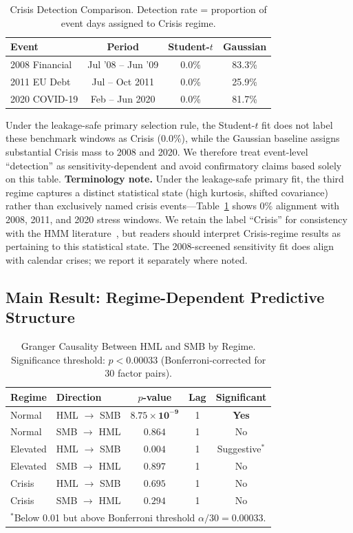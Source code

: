 \documentclass[sigconf,anonymous]{acmart}
\begin{document}
\begin{table}[t]
\centering
\caption{Crisis Detection Comparison. Detection rate = proportion of event days
assigned to Crisis regime.}
\label{tab:detection}
\small
\begin{tabular}{lccc}
\toprule
Event & Period & Student-$t$ & Gaussian \\
\midrule
2008 Financial & Jul '08 -- Jun '09 & 0.0\% & 83.3\% \\
2011 EU Debt & Jul -- Oct 2011 & 0.0\% & 25.9\% \\
2020 COVID-19 & Feb -- Jun 2020 & 0.0\% & 81.7\% \\
\bottomrule
\end{tabular}
\end{table}

Under the leakage-safe primary selection rule, the Student-$t$ fit does not
label these benchmark windows as Crisis (0.0\%), while the Gaussian baseline
assigns substantial Crisis mass to 2008 and 2020. We therefore treat event-level
``detection'' as sensitivity-dependent and avoid confirmatory claims based solely
on this table.
\textbf{Terminology note.} Under the leakage-safe primary fit, the third regime
captures a distinct statistical state (high kurtosis, shifted covariance) rather
than exclusively named crisis events---Table~\ref{tab:detection} shows 0\% alignment
with 2008, 2011, and 2020 stress windows. We retain the label ``Crisis'' for
consistency with the HMM literature~\cite{bulla2011hidden}, but readers should
interpret Crisis-regime results as pertaining to this statistical state. The
2008-screened sensitivity fit does align with calendar crises; we report it
separately where noted.

\subsection{Main Result: Regime-Dependent Predictive Structure}
\label{sec:main_result}

\begin{table}[t]
\centering
\caption{Granger Causality Between HML and SMB by Regime. Significance threshold:
$p < 0.00033$ (Bonferroni-corrected for 30 factor pairs).}
\label{tab:main}
\small
\begin{tabular}{llccc}
\toprule
Regime & Direction & $p$-value & Lag & Significant \\
\midrule
Normal & HML $\to$ SMB & $\mathbf{8.75 \times 10^{-9}}$ & 1 & \textbf{Yes} \\
Normal & SMB $\to$ HML & $0.864$ & 1 & No \\
\midrule
Elevated & HML $\to$ SMB & $0.004$ & 1 & Suggestive$^*$ \\
Elevated & SMB $\to$ HML & $0.897$ & 1 & No \\
\midrule
Crisis & HML $\to$ SMB & $0.695$ & 1 & No \\
Crisis & SMB $\to$ HML & $0.294$ & 1 & No \\
\bottomrule
\multicolumn{5}{l}{\footnotesize $^*$Below 0.01 but above Bonferroni threshold $\alpha/30 = 0.00033$.}
\end{tabular}
\end{table}
\end{document}
